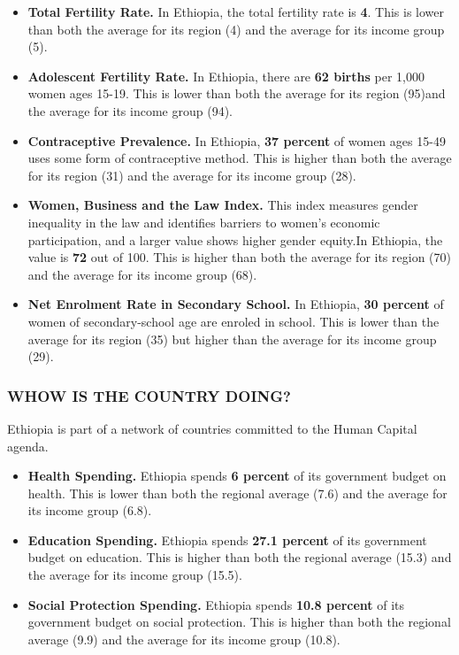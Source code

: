 \documentclass[9.2pt,twocolumn]{article}
\begin{document}
\begin{itemize}
\item
  \textbf{Total Fertility Rate.} In Ethiopia, the total fertility rate
  is \textbf{4}. This is lower than both the average for its region (4)
  and the average for its income group (5).
\item
  \textbf{Adolescent Fertility Rate.} In Ethiopia, there are \textbf{62
  births} per 1,000 women ages 15-19. This is lower than both the
  average for its region (95)and the average for its income group (94).
\item
  \textbf{Contraceptive Prevalence.} In Ethiopia, \textbf{37 percent} of
  women ages 15-49 uses some form of contraceptive method. This is
  higher than both the average for its region (31) and the average for
  its income group (28).
\item
  \textbf{Women, Business and the Law Index.} This index measures gender
  inequality in the law and identifies barriers to women's economic
  participation, and a larger value shows higher gender equity.In
  Ethiopia, the value is \textbf{72} out of 100. This is higher than
  both the average for its region (70) and the average for its income
  group (68).
\item
  \textbf{Net Enrolment Rate in Secondary School.} In Ethiopia,
  \textbf{30 percent} of women of secondary-school age are enroled in
  school. This is lower than the average for its region (35) but higher
  than the average for its income group (29).
\end{itemize}

\hypertarget{section-2}{%
\subsubsection{\texorpdfstring{\textcolor{bondiblue}{\textbf{W\small{HOW IS THE COUNTRY DOING?}}}}{}}\label{section-2}}

Ethiopia is part of a network of countries committed to the Human
Capital agenda.

\begin{itemize}
\item
  \textbf{Health Spending.} Ethiopia spends \textbf{6 percent} of its
  government budget on health. This is lower than both the regional
  average (7.6) and the average for its income group (6.8).
\item
  \textbf{Education Spending.} Ethiopia spends \textbf{27.1 percent} of
  its government budget on education. This is higher than both the
  regional average (15.3) and the average for its income group (15.5).
\item
  \textbf{Social Protection Spending.} Ethiopia spends \textbf{10.8
  percent} of its government budget on social protection. This is higher
  than both the regional average (9.9) and the average for its income
  group (10.8).
\end{itemize}
\end{document}
